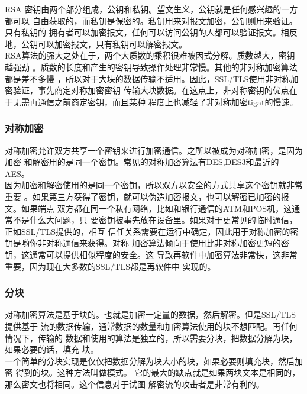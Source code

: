 \documentclass[11pt,dvips]{article}
\begin{document}
RSA 密钥由两个部分组成，公钥和私钥。望文生义，公钥就是任何感兴趣的一方都可以
自由获取的，而私钥是保密的。私钥用来对报文加密，公钥则用来验证。只有私钥的
拥有者可以加密报文，任何可以访问公钥的人都可以验证报文。相反地，公钥可以加密报文，只有私钥可以解密报文。\\

RSA算法的强大之处在于，两个大质数的乘积很难被因式分解。质数越大，密钥越强劲
。质数的长度和产生的密钥导致操作处理非常慢。其他的非对称加密算法都是差不多慢
，所以对于大块的数据传输不适用。因此，SSL/TLS使用非对称加密验证，事先商定对称加密密钥
传输大块数据。在这点上，非对称密钥的优点在于无需再通信之前商定密钥，而且某种
程度上也减轻了非对称加密tigat的慢速。 \\

\subsubsection{对称加密}

对称加密允许双方共享一个密钥来进行加密通信。之所以被成为对称加密，是因为加密
和解密用的是同一个密钥。常见的对称加密算法有DES,DES3和最近的AES。\\

因为加密和解密使用的是同一个密钥，所以双方以安全的方式共享这个密钥就非常重要
。如果第三方获得了密钥，就可以伪造加密报文，也可以解密已加密的报文。如果端点
双方都在同一个私有网络，比如和银行通信的ATM和POS机，这通常不是什么大问题，只
要密钥被事先放在设备里。如果对于更常见的临时通信，正如SSL/TLS提供的，相互
信任关系需要在运行中确定，因此用于对称加密的密钥是哟你非对称通信来获得。对称
加密算法倾向于使用比非对称加密更短的密钥，这通常可以提供相似程度的安全。这
导致再软件中加密算法非常快，这非常重要，因为现在大多数的SSL/TLS都是再软件中
实现的。


\subsubsection{分块}

对称加密算法是基于块的。也就是加密一定量的数据，然后解密。但是SSL/TLS提供基于
流的数据传输，通常数据的数量和加密算法使用的块不想匹配。再任何情况下，传输的
数据和使用的算法是独立的，所以需要分块，把数据分解为块，如果必要的话，填充
块。\\

一个简单的分块实现是仅仅把数据分解为块大小的块，如果必要则填充块，然后加密
得到的块。这种方法叫做{}模式。
它的最大的缺点就是如果两块文本是相同的，那么密文也将相同。这个信息对于试图
解密流的攻击者是非常有利的。\\
\end{document}
